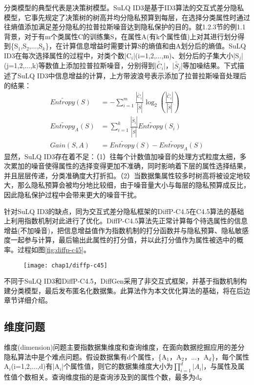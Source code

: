 分类模型的典型代表是决策树模型。SuLQ ID3\cite{SuLQ}是基于ID3算法的交互式差分隐私模型，它事先规定了决策树的树高并均分隐私预算到每层，在选择分类属性时通过往熵值添加满足差分隐私的拉普拉斯噪音达到隐私保护的目的。就1.2.3节的例1.1背景，对于有m个类属性C的训练集S，在属性A(有k个属性值)上对其进行划分得到\{S$_{1}$,S$_{2}$,...,S$_{k}$\}，在计算信息增益时需要计算S的熵值和由A划分后的熵值。SuLQ ID3在每次选择属性的过程中，对类个数|C$_{i}$|(i=1,2,...,m)、划分后的子集大小|S$_{j}$|(j=1,2,...,k)等数值上添加拉普拉斯噪音，分别得到|$\widetilde{C_{i}}$|，|$\widetilde{S_{j}}$|等加噪结果。下式描述了SuLQ ID3中信息增益的计算，上方带波浪号表示添加了拉普拉斯噪音处理后的结果：
\[
\begin{split}
	En\widetilde{tro}py(S) &= -\sum_{i=1}^{m}\frac{|\widetilde{C_{i}}|}{|\widetilde{S}|}\log_{2}(\frac{|\widetilde{C_{i}}|}{|\widetilde{S}|})\\
	En\widetilde{tro}py_{A}(S) &= \sum_{i=1}^{k}\frac{|\widetilde{S_{i}}|}{|\widetilde{S}|}En\widetilde{tro}py(S_{i})\\
	Gain(S,A) &= En\widetilde{tro}py(S)-En\widetilde{tro}py_{A}(S)
\end{split}	
\]
显然，SuLQ ID3存在着不足：（1）往每个计数值加噪音的处理方式粒度太细，多次累加的噪音使得属性的选择变得更加不准确，同时影响着下层的属性选择结果，并且层层传递，分类准确度大打折扣。（2）当数据集属性较多时树高将被设定地较大，那么隐私预算会被均分地比较细，由于噪音量大小与每层的隐私预算成反比，因此隐私保护过程中会带来更大的噪音干扰。

针对SuLQ ID3的缺点，同为交互式差分隐私框架的DiffP-C4.5\cite{diffp-c4.5}在C4.5算法的基础上利用指数机制对此进行了优化。DiffP-C4.5算法先正常计算每个待选属性的信息增益(不加噪音)，把信息增益值作为指数机制的打分函数并与隐私预算、隐私敏感度一起参与计算，最后输出此属性的打分值，并以此打分值作为属性被选中的概率。过程如图\ref{fig:diffp-c45}。

\begin{figure}[!htp]
	\centering
	\texttt{[image: chap1/diffp-c45]}
\end{figure}

不同于SuLQ ID3和DiffP-C4.5，DiffGen\cite{DiffGen}采用了非交互式框架，并基于指数机制构建分类模型，最后发布匿名化数据集。此算法作为本文优化算法的基础，将在后边章节详细介绍。

\subsection{维度问题}
\label{sec:weidu}
维度(dimension)问题主要指数据集维度和查询维度，在面向数据挖掘应用的差分隐私算法中是个难点问题。假设数据集有d个属性，\{A$_{1}$，A$_{2}$，...，A$_{d}$\}，每个属性A$_{i}$(i=1,2,...,d)有|A$_{i}$|个属性值，则它的数据集维度大小为\(\prod\limits_{i = 1}^d {|A{_i} |}\)，与属性及属性值个数相关。查询维度指的是查询涉及到的属性个数，最多为d。

